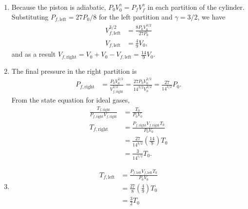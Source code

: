 \documentclass[a4paper,12pt]{article}
\begin{document}
\begin{enumerate}[label=\textbf{[\arabic*]}]
    \item
        \begin{enumerate}
            \item
                Because the piston is adiabatic, $P_0 V_0^\gamma = P_f V_f^\gamma$ in each partition of the cylinder. Substituting $P_{f, \text{left}} = 27 P_0 / 8$ for the left partition and $\gamma = 3/2$, we have
                \begin{align*}
                    V_{f, \text{left}}^{3/2} &= \frac{8P_0 V_0^{3/2}}{27P_0} \\
                    V_{f, \text{left}} &= \frac{4}{9} V_0,
                \end{align*}
                and as a result $V_{f, \text{right}} = V_0 + V_0 - V_{f, \text{left}} = \frac{14}{9} V_0$.

            \item
                The final pressure in the right partition is
                \begin{align*}
                    P_{f, \text{right}} &= \frac{P_0 V_0^{3/2}}{V_{f , \text{right}}^{3/2}} = \frac{27 P_0 V_0^{3/2}}{14^{3/2} V_0^{3/2}} = \frac{27}{14^{3/2}} P_0.
                \end{align*}
                From the state equation for ideal gases,
                \begin{align*}
                    \frac{T_{f, \text{right}}}{P_{f, \text{right}}{V_{f, \text{right}}}} &= \frac{T_0}{P_0 V_0} \\
                    T_{f, \text{right}} &= \frac{P_{f, \text{right}}{V_{f, \text{right}}} T_0}{P_0 V_0} \\
                    &= \frac{27}{14^{3/2}} \left( \frac{14}{9} \right) T_0 \\
                    &= \frac{3}{14^{1/2}} T_0.
                \end{align*}

            \item
                \begin{align*}
                    T_{f, \text{left}} &= \frac{P_{f, \text{left}}{V_{f, \text{left}}} T_0}{P_0 V_0} \\
                    &= \frac{27}{8} \left( \frac{4}{9} \right) T_0 \\
                    &= \frac{3}{2} T_0
                \end{align*}


\end{enumerate}
\end{enumerate}
\end{document}
